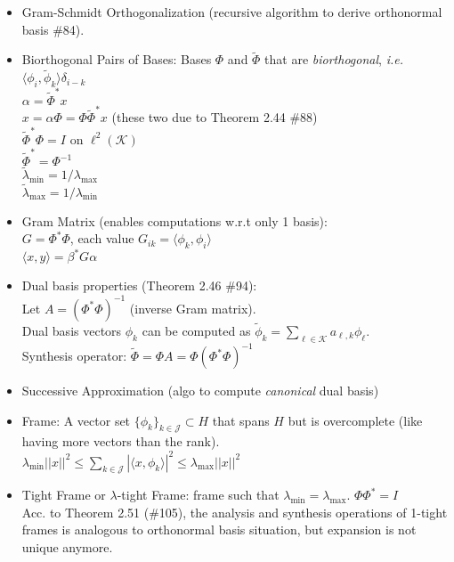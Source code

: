 \documentclass{article}
\newcommand{\ie}{\textit{i.e. }}
\newcommand{\la}{\langle}
\newcommand{\ra}{\rangle}
\begin{document}
\begin{itemize}
\begin{itemize}
 	\item Gram-Schmidt Orthogonalization (recursive algorithm to derive orthonormal basis \#84).
 	\item Biorthogonal Pairs of Bases: Bases $\Phi$ and $\tilde{\Phi}$ that are \textit{biorthogonal}, \ie $\la \phi_i, \tilde{\phi}_k\ra\delta_{i-k}$ \\
 	{\footnotesize\color{gray}
 	$\alpha=\tilde{\Phi}^{*}x$ \\
 	$x=\alpha\Phi=\Phi\tilde{\Phi}^{*}x$ (these two due to Theorem 2.44 \#88) \\
 	$\tilde{\Phi}^{*}\Phi=I$ on $\ell^2(\mathcal{K})$ \\
 	$\tilde{\Phi}^{*}=\Phi^{-1}$ \\
 	$\tilde{\lambda}_{\min}=1/\lambda_{\max}$ \\
 	$\tilde{\lambda}_{\max}=1/\lambda_{\min}$
 	}
 	\item Gram Matrix (enables computations w.r.t only 1 basis): \\
 	{\footnotesize \color{gray}
 	$G=\Phi^{*}\Phi$, each value $G_{ik}=\la \phi_k, \phi_i \ra$ \\
 	$\la x,y \ra = \beta^{*}G\alpha$
 	}
 	\item Dual basis properties (Theorem 2.46 \#94): \\
 	{\footnotesize\color{gray}
 	Let $A=(\Phi^{*}\Phi)^{-1}$ (inverse Gram matrix). \\
 	Dual basis vectors $\phi_k$ can be computed as $\tilde{\phi}_k=\sum_{\ell\in\mathcal{K}}a_{\ell,k}\phi_{\ell}$. \\
 	Synthesis operator: $\tilde{\Phi}=\Phi A = \Phi (\Phi^{*}\Phi)^{-1}$
 	}
 	\item Successive Approximation (algo to compute \textit{canonical} dual basis)
 	\item Frame: A vector set $\{\phi_k\}_{k\in\mathcal{J}}\subset H$ that spans $H$ but is overcomplete (like having more vectors than the rank).\\
 	{
 	\footnotesize\color{gray} $\lambda_{\min}||x||^2 \le \sum_{k\in\mathcal{J}}|\la x, \phi_k\ra|^2\le \lambda_{\max}||x||^2$
 	}
 	\item Tight Frame or $\lambda$-tight Frame: frame such that  $\lambda_{\min}=\lambda_{\max}$. 
 	{ \footnotesize\color{gray}
 	$\Phi\Phi^{*}=I$ \\
 	Acc. to Theorem 2.51 (\#105), the analysis and synthesis operations of 1-tight frames is analogous to orthonormal basis situation, but expansion is not unique anymore.
 	}
 	\end{itemize}

\end{itemize}
\end{document}
